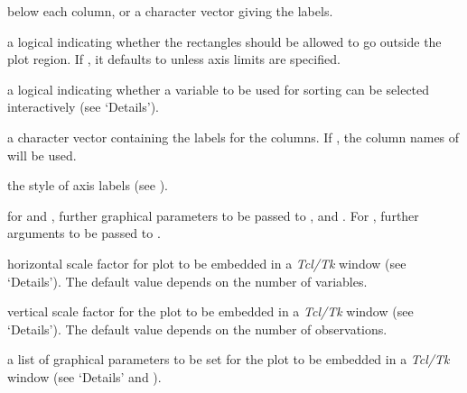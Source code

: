 \begin{Arguments}
\begin{ldescription}
below each column, or a character vector giving the labels.
\item[\code{xpd}] a logical indicating whether the rectangles should be allowed to 
go outside the plot region.  If , it defaults to  
unless axis limits are specified.
\item[\code{interactive}] a logical indicating whether a variable to be used for 
sorting can be selected interactively (see `Details').
\item[\code{xaxlabels}] a character vector containing the labels for the columns.  
If , the column names of  will be used.
\item[\code{las}] the style of axis labels (see ).
\item[\code{...}] for  and , further graphical 
parameters to be passed to , 
 and .  For 
, further arguments to be passed to .
\item[\code{hscale}] horizontal scale factor for plot to be embedded in a 
\emph{Tcl/Tk} window (see `Details').  The default value depends on 
the number of variables.
\item[\code{vscale}] vertical scale factor for the plot to be embedded in a 
\emph{Tcl/Tk} window (see `Details').  The default value depends on 
the number of observations.
\item[\code{TKRpar}] a list of graphical parameters to be set for the plot to be 
embedded in a \emph{Tcl/Tk} window (see `Details' and 
).
\end{ldescription}
\end{Arguments}
%
